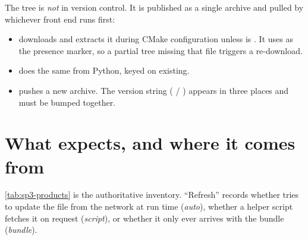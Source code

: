 The  tree is \emph{not} in version control. It is
published as a single  archive and pulled by whichever
front end runs first:

\begin{itemize}[leftmargin=1.4em]
  \item {} downloads and extracts it during
    CMake configuration unless  is . It uses
     as the presence marker, so a partial
    tree missing that file triggers a re-download.
  \item {} does the same from Python,
    keyed on  existing.
  \item {} pushes a new archive. The version
    string ( / ) appears in
    three places and must be bumped together.
\end{itemize}

\section{What \lupnt{} expects, and where it comes from}
\label{sec:sp3-products}

\cref{tab:sp3-products} is the authoritative inventory. ``Refresh'' records
whether \lupnt{} tries to update the file from the network at run time
(\emph{auto}), whether a helper script fetches it on request (\emph{script}),
or whether it only ever arrives with the bundle (\emph{bundle}).

